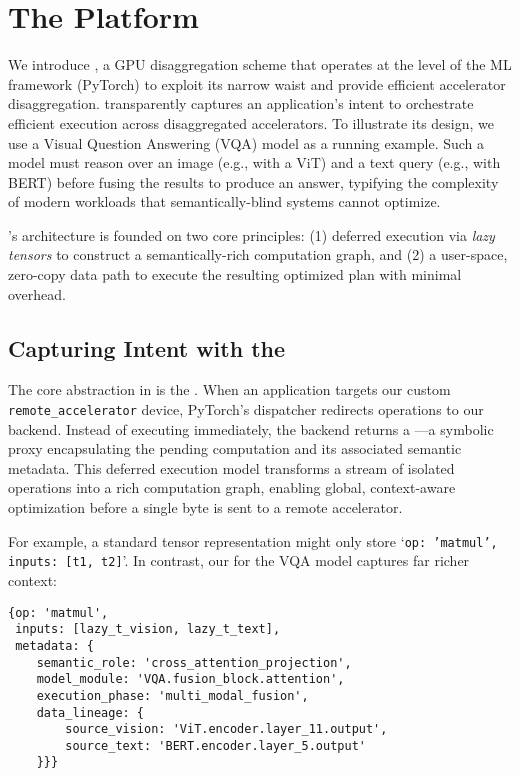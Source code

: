 \section{The \sys Platform}
\label{sec:framework}

We introduce \sys, a GPU disaggregation scheme that operates at the level of the ML framework (PyTorch) to exploit its narrow waist and provide efficient accelerator disaggregation.
\sys transparently captures an application's intent to orchestrate efficient execution across disaggregated accelerators.
To illustrate its design, we use a Visual Question Answering (VQA) model as a running example. Such a model must reason over an image (e.g., with a ViT) and a text query (e.g., with BERT) before fusing the results to produce an answer, typifying the complexity of modern workloads that semantically-blind systems cannot optimize.

\sys's architecture is founded on two core principles: (1) deferred execution via \emph{lazy tensors} to construct a semantically-rich computation graph, and (2) a user-space, zero-copy data path to execute the resulting optimized plan with minimal overhead.

\subsection{Capturing Intent with the \lazytensor}
\label{ssec:lazy_tensor}

The core abstraction in \sys is the \emph{\lazytensor}.
When an application targets our custom \texttt{remote\_accelerator} device, PyTorch's dispatcher redirects operations to our backend.
Instead of executing immediately, the backend returns a \lazytensor---a symbolic proxy encapsulating the pending computation and its associated semantic metadata. 
This deferred execution model transforms a stream of isolated operations into a rich computation graph, enabling global, context-aware optimization before a single byte is sent to a remote accelerator.

For example, a standard tensor representation might only store `\texttt{{op: 'matmul', inputs: [t1, t2]}}'.
In contrast, our \lazytensor for the VQA model captures far richer context:

{\small\begin{verbatim}
{op: 'matmul',
 inputs: [lazy_t_vision, lazy_t_text],
 metadata: {
    semantic_role: 'cross_attention_projection',
    model_module: 'VQA.fusion_block.attention',
    execution_phase: 'multi_modal_fusion',
    data_lineage: {
        source_vision: 'ViT.encoder.layer_11.output',
        source_text: 'BERT.encoder.layer_5.output'
    }}}
\end{verbatim}
}


